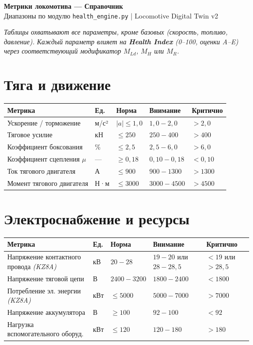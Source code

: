 \documentclass[a4paper,11pt]{article}
\newcommand{\metricsheader}{%
  \rowcolor{headerbg}
  \color{headertext}\textbf{Метрика} &
  \color{headertext}\textbf{Ед.} &
  \color{headertext}\textbf{Норма} &
  \color{headertext}\textbf{Внимание} &
  \color{headertext}\textbf{Критично} \\
}
\begin{document}
\begin{center}
  {\LARGE\bfseries Метрики локомотива — Справочник}\\[4pt]
  {\small Диапазоны по модулю \texttt{health\_engine.py} | Locomotive Digital Twin v2}
\end{center}

\vspace{4pt}
\noindent\textit{Таблицы охватывают все параметры, кроме базовых (скорость, топливо, давление).
Каждый параметр влияет на \textbf{Health Index} (0–100, оценки A–E) через
соответствующий модификатор $M_{Ld}$, $M_H$ или $M_R$.}

\section{Тяга и движение}
\begin{tabularx}{\textwidth}{L{5.0cm} C{1.2cm} L{2.8cm} L{3.0cm} L{3.0cm}}
\toprule
\metricsheader
\midrule
{} Ускорение / торможение       & м/с² & $|a| \leq 1{,}0$ & $1{,}0 - 2{,}0$   & $> 2{,}0$  \\
 Тяговое усилие               & кН   & $\leq 250$        & $250 - 400$        & $> 400$    \\
 Коэффициент боксования       & \%   & $\leq 2{,}5$      & $2{,}5 - 6{,}0$    & $> 6{,}0$  \\
 Коэффициент сцепления $\mu$  & —    & $\geq 0{,}18$     & $0{,}10 - 0{,}18$  & $< 0{,}10$ \\
 Ток тягового двигателя       & А    & $\leq 900$        & $900 - 1300$       & $> 1300$   \\
 Момент тягового двигателя    & Н·м  & $\leq 3000$       & $3000 - 4500$      & $> 4500$   \\
\bottomrule
\end{tabularx}

\section{Электроснабжение и ресурсы}
\begin{tabularx}{\textwidth}{L{5.8cm} C{1.2cm} L{2.8cm} L{2.8cm} L{2.4cm}}
\toprule
\metricsheader
\midrule
{} Напряжение контактного провода \textit{(KZ8A)} & кВ  & $20 - 28$     & $19 - 20$ или $28 - 28{,}5$ & $< 19$ или $> 28{,}5$ \\
 Напряжение тяговой цепи                        & В   & $2400 - 3200$ & $1800 - 2400$               & $< 1800$ \\
 Потребление эл. энергии \textit{(KZ8A)}        & кВт & $\leq 5000$   & $5000 - 7000$               & $> 7000$ \\
 Напряжение аккумулятора                        & В   & $\geq 100$    & $92 - 100$                  & $< 92$   \\
 Нагрузка вспомогательного оборуд.             & кВт & $\leq 120$    & $120 - 180$                 & $> 180$  \\
\bottomrule
\end{tabularx}
\end{document}
